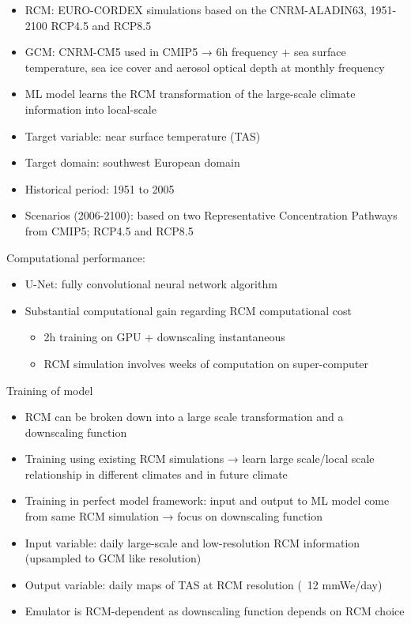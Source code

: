 \documentclass[a4paper,11pt,oneside]{report}
\begin{document}
\begin{itemize}
\item RCM: EURO-CORDEX simulations based on the CNRM-ALADIN63, 1951-2100 RCP4.5 and RCP8.5
\item GCM: CNRM-CM5 used in CMIP5 → 6h frequency + sea surface temperature, sea ice cover and aerosol optical depth at monthly frequency
\item ML model learns the RCM transformation of the large-scale climate information into local-scale
\item Target variable: near surface temperature (TAS)
\item Target domain: southwest European domain
\item Historical period: 1951 to 2005
\item Scenarios (2006-2100): based on two Representative Concentration Pathways from CMIP5; RCP4.5 and RCP8.5
\end{itemize}
Computational performance:
\begin{itemize}
    \item U-Net: fully convolutional neural network algorithm
    \item Substantial computational gain regarding RCM computational cost
    \begin{itemize}
        \item 2h training on GPU + downscaling instantaneous
        \item RCM simulation involves weeks of computation on super-computer
    \end{itemize}
\end{itemize}
Training of model 
\begin{itemize}
    \item RCM can be broken down into a large scale transformation and a downscaling function
    \item Training using existing RCM simulations → learn large scale/local scale relationship in different climates and in future climate
    \item Training in perfect model framework: input and output to ML model come from same RCM simulation → focus on downscaling function
    \item Input variable: daily large-scale and low-resolution RCM information (upsampled to GCM like resolution)
    \item Output variable: daily maps of TAS at RCM resolution (~12 \si{mmWe/day})
    \item Emulator is RCM-dependent as downscaling function depends on RCM choice
\end{itemize}
\end{document}

